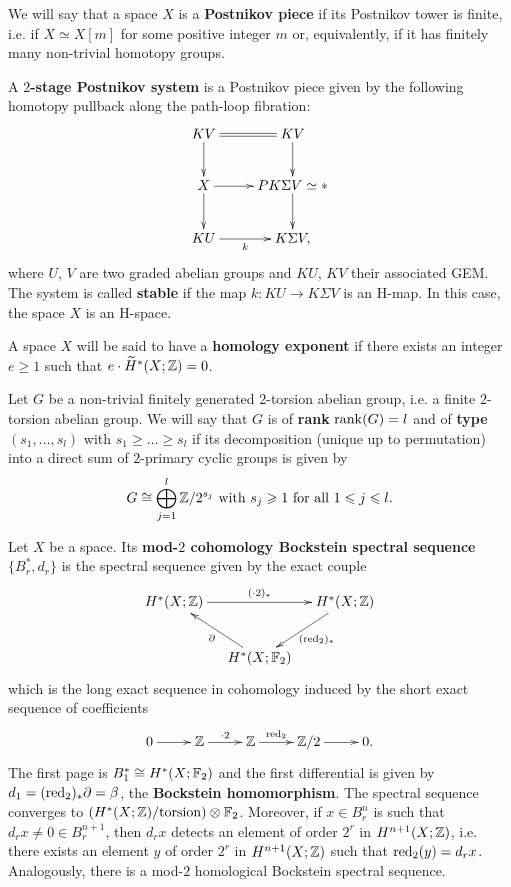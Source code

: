 We will say that a space $X$ is a {\bf Postnikov piece} if its Postnikov tower is finite, i.e. if $X\simeq X[m]$ for some positive integer $m$ or, equivalently, if it has finitely many non-trivial homotopy groups.

A {\bf $2$-stage Postnikov system}\label{d:two-stage Postnikov system} is a Postnikov piece given by the following homotopy pullback along the path-loop fibration:
$$\xymatrix{
KV\ar[d]\ar@{=}[r] &KV\ar[d]\\
X\ar[d]\ar[r] &PK\Sigma V\simeq{*}\ar[d]\\
KU\ar[r]_-k &K\Sigma V,
}$$ where $U$, $V$ are two graded abelian groups and $KU$, $KV$ their associated GEM. The system is called {\bf stable} if the map $k:KU\to K\Sigma V$ is an H-map. In this case, the space $X$ is an H-space.

A space $X$ will be said to have a {\bf homology exponent} if there exists an integer $e\geq1$ such that $e\cdot\widetilde{H}^*(X;\mathbb{Z})=0$.

Let $G$ be a non-trivial finitely generated $2$-torsion abelian group, i.e. a finite $2$-torsion abelian group. We will say that $G$ is of {\bf rank} $\operatorname{rank}(G)=l$ and of {\bf type} $(s_1,\dots,s_l)$ with $s_1\geq\dots\geq s_l$ if its decomposition (unique up to permutation) into a direct sum of $2$-primary cyclic groups is given by
$$
G\cong\bigoplus_{j=1}^l\mathbb{Z}/2^{s_j}\text{ with $s_j\geqslant1$ for all $1\leqslant j\leqslant l$.}
$$

Let $X$ be a space. Its {\bf mod-$2$ cohomology Bockstein spectral sequence} $\{B^*_r,d_r\}$ is the spectral sequence given by the exact couple 
$$\xymatrix@C=0.4truecm{
H^*(X;\Z)\ar[rr]^-{(\cdot2)_*} &&H^*(X;\Z)\ar[ld]^{(\red_2)_*}\\
&H^*(X;\F_2)\ar[lu]^{\partial}
}$$
which is the long exact sequence in cohomology induced by the short exact sequence of coefficients
$$\xymatrix{
0\ar[r] &\Z\ar[r]^-{\cdot2} &\Z\ar[r]^-{\red_2} &\Z/2\ar[r] &0.
}$$
The first page is $B_1^*\cong H^*(X;\mathbb{F}_2)$ and the first differential is given by $d_1=(\operatorname{red}_2)_*\partial=\beta$, the {\bf Bockstein homomorphism}. The spectral sequence converges to $(H^*(X;\mathbb{Z})/\text{torsion})\otimes\mathbb{F}_2$. Moreover, if $x\in B_r^{n}$ is such that $d_r x\not=0\in B_r^{n+1}$, then $d_r x$ detects an element of order $2^r$ in $H^{n+1}(X;\mathbb{Z})$, i.e. there exists an element $y$ of order $2^r$ in $H^{n+1}(X;\mathbb{Z})$ such that $\operatorname{red}_2(y)=d_rx$. Analogously, there is a mod-$2$ homological Bockstein spectral sequence.

